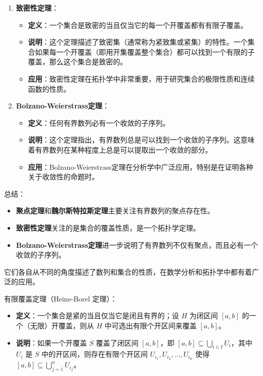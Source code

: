 \documentclass[12pt, a4paper, oneside, UTF8]{ctexbook}
\begin{document}
\begin{change}
\begin{enumerate}
		\item \textbf{致密性定理}：
		\begin{itemize}
			\item \textbf{定义}：一个集合是致密的当且仅当它的每一个开覆盖都有有限子覆盖。
			\item \textbf{说明}：这个定理描述了致密集（通常称为紧致集或紧集）的特性。一个集合如果每一个开覆盖（即用开集覆盖整个集合）都可以找到一个有限的子覆盖，那么这个集合是致密的。
			\item \textbf{应用}：致密性定理在拓扑学中非常重要，用于研究集合的极限性质和连续函数的性质。
		\end{itemize}
		
		\item \textbf{Bolzano-Weierstrass定理}：
		\begin{itemize}
			\item \textbf{定义}：任何有界数列必有一个收敛的子序列。
			\item \textbf{说明}：这个定理指出，有界数列总是可以找到一个收敛的子序列。这意味着有界数列在某种程度上总是可以提取出一个收敛的部分。
			\item \textbf{应用}：Bolzano-Weierstrass定理在分析学中广泛应用，特别是在证明各种关于收敛性的命题时。
		\end{itemize}
	\end{enumerate}
	
	总结：
	\begin{itemize}
		\item \textbf{聚点定理}和\textbf{魏尔斯特拉斯定理}主要关注有界数列的聚点存在性。
		\item \textbf{致密性定理}关注的是集合的覆盖性质，是一个拓扑学定理。
		\item \textbf{Bolzano-Weierstrass定理}进一步说明了有界数列不仅有聚点，而且必有一个收敛的子序列。
	\end{itemize}
	
	它们各自从不同的角度描述了数列和集合的性质，在数学分析和拓扑学中都有着广泛的应用。
	
	\item 有限覆盖定理（Heine-Borel 定理）：
	\begin{itemize}
		\item \textbf{定义}：一个集合是紧的当且仅当它是闭且有界的；设 $H$ 为闭区间 $[a,b]$ 的一个（无限）开覆盖，则从 $H$ 中可选出有限个开区间来覆盖 $[a,b]$。
		\item \textbf{说明}：如果一个开覆盖 \( S \) 覆盖了闭区间 \([a, b]\)，即 \([a, b] \subseteq \bigcup_{i \in I} U_i\)，其中 \( U_i \) 是 \( S \) 中的开区间，则存在有限个开区间 \( U_{i_1}, U_{i_2}, \ldots, U_{i_n} \) 使得 \([a, b] \subseteq \bigcup_{j=1}^n U_{i_j}\)。
	\end{itemize}
	
\end{change}
\end{document}
